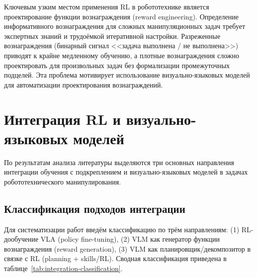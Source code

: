     Ключевым узким местом применения RL в робототехнике является проектирование функции вознаграждения (reward engineering). Определение информативного вознаграждения для сложных манипуляционных задач требует экспертных знаний и трудоёмкой итеративной настройки. Разреженные вознаграждения (бинарный сигнал <<задача выполнена / не выполнена>>) приводят к крайне медленному обучению, а плотные вознаграждения сложно проектировать для произвольных задач без формализации промежуточных подцелей. Эта проблема мотивирует использование визуально-языковых моделей для автоматизации проектирования вознаграждений.

\section{Интеграция RL и визуально-языковых моделей}
\label{sec:integration}

    По результатам анализа литературы выделяются три основных направления интеграции обучения с подкреплением и визуально-языковых моделей в задачах робототехнического манипулирования.

\subsection{Классификация подходов интеграции}
\label{subsec:integration-classification}

    Для систематизации работ введём классификацию по трём направлениям: (1) RL-дообучение VLA (policy fine-tuning), (2) VLM как генератор функции вознаграждения (reward generation), (3) VLM как планировщик/декомпозитор в связке с RL (planning + skills/RL). Сводная классификация приведена в таблице~\ref{tab:integration-classification}.

